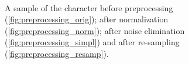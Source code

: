 \begin{figure}
	\centering
          \\
    \caption{A sample of the character  before preprocessing (\ref{fig:preprocessing_orig}); after normalization (\ref{fig:preprocessing_norm}); after noise elimination (\ref{fig:preprocessing_simpl}) and after re-sampling (\ref{fig:preprocessing_resamp}).}
   \label{fig:before_after_preprocessing}
\end{figure}



